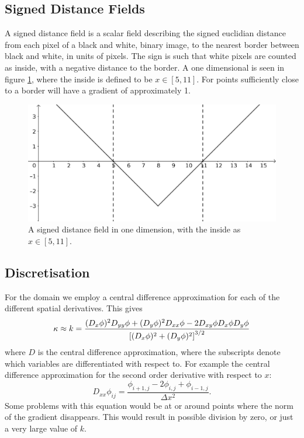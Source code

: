 \documentclass[sigconf]{acmart}
\begin{document}
\subsection{Signed Distance Fields}
A signed distance field is a scalar field describing the signed euclidian distance from each pixel of a black and white, binary image, to the nearest border between black and white, in units of pixels. The sign is such that white pixels are counted as inside, with a negative distance to the border. A one dimensional is seen in figure \ref{fig:signed_dist}, where the inside is defined to be $ x \in [5, 11] $. For points sufficiently close to a border will have a gradient of approximately 1.
\begin{figure}
	\includegraphics[width=\linewidth]{signed_distance_1d}
	\caption{A signed distance field in one dimension, with the inside as $ x \in [5, 11] $.}
	\label{fig:signed_dist}
\end{figure}


\subsection{Discretisation}
For the domain we employ a central difference approximation for each of the different spatial derivatives. This gives
\begin{equation}\label{key}
	\kappa \approx k = \frac{(D_x \phi)^2 D_{yy}\phi + (D_y \phi)^2 D_{xx}\phi - 2D_{xy}\phi D_x \phi D_y \phi}{\left[ (D_x\phi)^2 + (D_y\phi)^2 \right]^{3/2}}
\end{equation}
where $ D $  is the central difference approximation, where the subscripts denote which variables are differentiated with respect to. For example the central difference approximation for the second order derivative with respect to $ x $:
\begin{equation}\label{key}
	D_{xx} \phi_{ij} = \frac{\phi_{i+1, j} - 2\phi_{i,j} + \phi_{i-1,j}}{\Delta x^2}.
\end{equation}
Some problems with this equation would be at or around points where the norm of the gradient disappears. This would result in possible division by zero, or just a very large value of $ k $.
\end{document}
